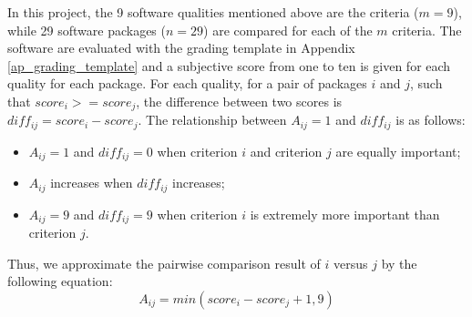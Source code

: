 In this project, the 9 software qualities mentioned above are the criteria ($m = 9$), while 29 software packages ($n = 29$) are compared for each of the $m$ criteria. The software are evaluated with the grading template in Appendix \ref{ap_grading_template} and a subjective score from one to ten is given for each quality for each package. For each quality, for a pair of packages $i$ and $j$, such that $score_i >= score_j$, the difference between two scores is $diff_{ij} = score_i - score_j$. The relationship between $A_{ij} = 1$ and $diff_{ij}$ is as follows:
\begin{itemize}
\item $A_{ij} = 1$ and $diff_{ij} = 0$ when criterion $i$ and criterion $j$ are equally important;
\item $A_{ij}$ increases when $diff_{ij}$ increases;
\item $A_{ij} = 9$ and $diff_{ij} = 9$ when criterion $i$ is extremely more important than criterion $j$.
\end{itemize}
Thus, we approximate the pairwise comparison result of $i$ versus $j$ by the following equation:
\begin{equation}
A_{ij} = min(score_i - score_j + 1, 9)
\end{equation}
